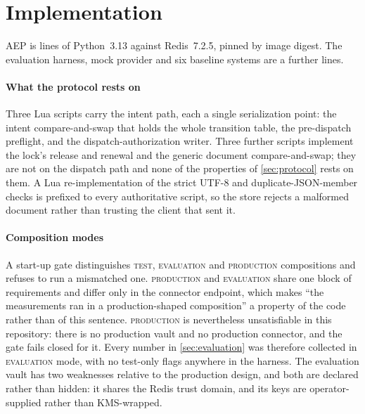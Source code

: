 \section{Implementation}
\label{sec:implementation}

AEP is \CoreLoc{} lines of Python~3.13 against Redis~7.2.5, pinned by image
digest. The evaluation harness, mock provider and six baseline systems are a
further \HarnessLoc{} lines.

\paragraph{What the protocol rests on} Three Lua scripts carry the intent
path, each a single serialization point: the intent compare-and-swap that
holds the whole transition table, the pre-dispatch preflight, and the
dispatch-authorization writer. Three further scripts implement the lock's
release and renewal and the generic document compare-and-swap; they are not on
the dispatch path and none of the properties of \cref{sec:protocol} rests on
them. A Lua re-implementation of the strict UTF-8 and duplicate-JSON-member
checks is prefixed to every authoritative script, so the store rejects a
malformed document rather than trusting the client that sent it.

\paragraph{Composition modes} A start-up gate distinguishes \textsc{test},
\textsc{evaluation} and \textsc{production} compositions and refuses to run a
mismatched one. \textsc{production} and \textsc{evaluation} share one block of
requirements and differ only in the connector endpoint, which makes ``the
measurements ran in a production-shaped composition'' a property of the code
rather than of this sentence. \textsc{production} is nevertheless
unsatisfiable in this repository: there is no production vault and no
production connector, and the gate fails closed for it. Every number in
\cref{sec:evaluation} was therefore collected in \textsc{evaluation} mode, with
no test-only flags anywhere in the harness. The evaluation vault has two
weaknesses relative to the production design, and both are declared rather than
hidden: it shares the Redis trust domain, and its keys are operator-supplied
rather than KMS-wrapped.

